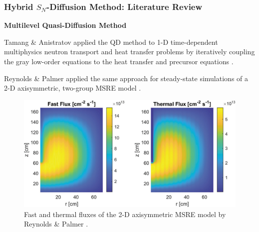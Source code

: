 \begin{frame}
  \frametitle{Hybrid $S_N$-Diffusion Method: Literature Review}
  \textbf{Multilevel Quasi-Diffusion Method}
  \vspace{.2cm}

  Tamang \& Anistratov applied the QD method to 1-D time-dependent multiphysics neutron transport
  and heat transfer problems by iteratively coupling the gray low-order equations to the heat
  transfer and precursor equations \cite{tamang_multilevel_2014}.
  \vspace{.2cm}

  Reynolds \& Palmer applied the same approach for steady-state simulations of a 2-D axisymmetric,
  two-group MSRE model \cite{reynolds_analysis_2023}.
  \begin{figure}[h]
    \centering
    \includegraphics[width=.6\columnwidth]{images/reynolds-flux}
    \caption{Fast and thermal fluxes of the 2-D axisymmetric MSRE model by Reynolds \& Palmer
    \cite{reynolds_analysis_2023}.}
    \label{fig:reynolds-flux}
  \end{figure}
\end{frame}

